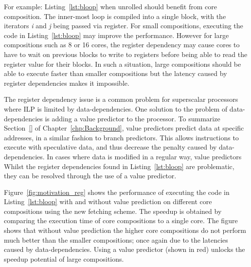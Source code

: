For example: Listing~\ref{lst:bloop} when unrolled should benefit from core composition.
The inner-most loop is compiled into a single block, with the iterators \textit{i} and \textit{j} being passed via register.
For small compositions, executing the code in Listing~\ref{lst:bloop} may improve the performance.
However for large compositions such as 8 or 16 cores, the register dependency may cause cores to have to wait on previous blocks to write to registers before being able to read the register value for their blocks.
In such a situation, large compositions should be able to execute faster than smaller compositions but the latency caused by register dependencies makes it impossible.

The register dependency issue is a common problem for superscalar processors~\cite{} where ILP is limited by data-dependencies.
One solution to the problem of data-dependencies is adding a value predictor to the processor.
To summarize Section~\ref{} of Chapter~\ref{chp:Background}, value predictors predict data at specific addresses, in a similar fashion to branch predictors.
This allows instructions to execute with speculative data, and thus decrease the penalty caused by data-dependencies.
In cases where data is modified in a regular way, value predictors 
Whilst the register dependencies found in Listing~\ref{lst:bloop} are problematic, they can be resolved through the use of a value predictor.

Figure~\ref{fig:motivation_reg} shows the performance of executing the code in Listing~\ref{lst:bloop} with and without value prediction on different core compositions using the new fetching scheme.
The speedup is obtained by comparing the execution time of core compositions to a single core.
The figure shows that without value prediction the higher core compositions do not perform much better than the smaller compositions; once again due to the latencies caused by data-dependencies.
Using a value predictor (shown in red) unlocks the speedup potential of large compositions.
